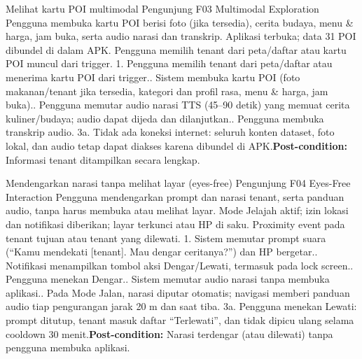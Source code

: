 {Melihat kartu POI multimodal}
{Pengunjung}
{F03 Multimodal Exploration}
{Pengguna membuka kartu POI berisi foto (jika tersedia), cerita budaya, menu \& harga, jam buka, serta audio narasi dan transkrip.}
{Aplikasi terbuka; data 31 POI dibundel di dalam APK.}
{Pengguna memilih tenant dari peta/daftar atau kartu POI muncul dari trigger.}
{1. Pengguna memilih tenant dari peta/daftar atau menerima kartu POI dari trigger.. Sistem membuka kartu POI (foto makanan/tenant jika tersedia, kategori dan profil rasa, menu \& harga, jam buka).. Pengguna memutar audio narasi TTS (45--90 detik) yang memuat cerita kuliner/budaya; audio dapat dijeda dan dilanjutkan.. Pengguna membuka transkrip audio.}
{3a. Tidak ada koneksi internet: seluruh konten dataset, foto lokal, dan audio tetap dapat diakses karena dibundel di APK.\newline\textbf{Post-condition:} Informasi tenant ditampilkan secara lengkap.}

{Mendengarkan narasi tanpa melihat layar (eyes-free)}
{Pengunjung}
{F04 Eyes-Free Interaction}
{Pengguna mendengarkan prompt dan narasi tenant, serta panduan audio, tanpa harus membuka atau melihat layar.}
{Mode Jelajah aktif; izin lokasi dan notifikasi diberikan; layar terkunci atau HP di saku.}
{Proximity event pada tenant tujuan atau tenant yang dilewati.}
{1. Sistem memutar prompt suara (``Kamu mendekati [tenant]. Mau dengar ceritanya?'') dan HP bergetar.. Notifikasi menampilkan tombol aksi Dengar/Lewati, termasuk pada lock screen.. Pengguna menekan Dengar.. Sistem memutar audio narasi tanpa membuka aplikasi.. Pada Mode Jalan, narasi diputar otomatis; navigasi memberi panduan audio tiap pengurangan jarak 20 m dan saat tiba.}
{3a. Pengguna menekan Lewati: prompt ditutup, tenant masuk daftar ``Terlewati'', dan tidak dipicu ulang selama cooldown 30 menit.\newline\textbf{Post-condition:} Narasi terdengar (atau dilewati) tanpa pengguna membuka aplikasi.}

